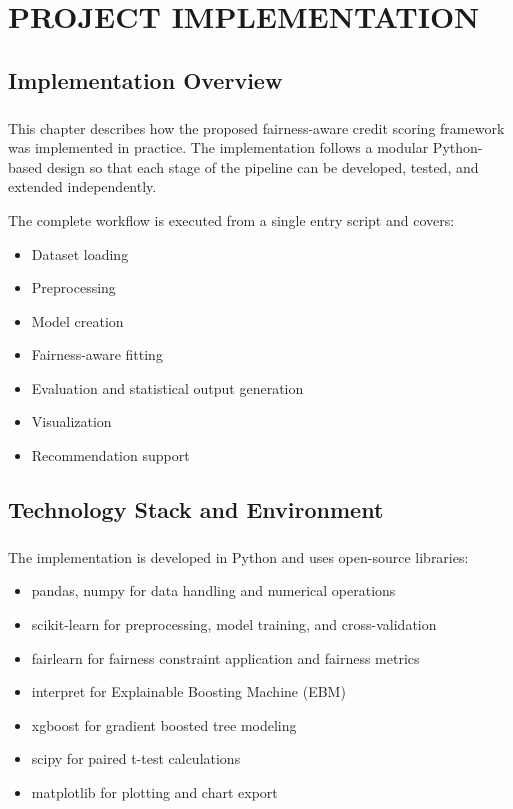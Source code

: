 \chapter{\MakeUppercase{Project Implementation}}

\section{Implementation Overview}
\paragraph{}

This chapter describes how the proposed fairness-aware credit scoring framework was implemented in practice. The implementation follows a modular Python-based design so that each stage of the pipeline can be developed, tested, and extended independently.

The complete workflow is executed from a single entry script and covers:
\begin{itemize}
    \item Dataset loading
    \item Preprocessing
    \item Model creation
    \item Fairness-aware fitting
    \item Evaluation and statistical output generation
    \item Visualization
    \item Recommendation support
\end{itemize}

\section{Technology Stack and Environment}
\paragraph{}

The implementation is developed in Python and uses open-source libraries:

\begin{itemize}
    \item pandas, numpy for data handling and numerical operations
    \item scikit-learn for preprocessing, model training, and cross-validation
    \item fairlearn for fairness constraint application and fairness metrics
    \item interpret for Explainable Boosting Machine (EBM)
    \item xgboost for gradient boosted tree modeling
    \item scipy for paired t-test calculations
    \item matplotlib for plotting and chart export
\end{itemize}

